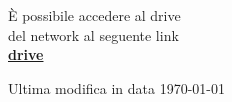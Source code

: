 \documentclass[a4paper, 11pt, oneside, article]{book} %
\begin{document}
\begin{titlepage}
	
	\vspace*{3\baselineskip} %
	
	È possibile accedere al drive \\del network al seguente link\\
	\textbf{\href{https://drive.google.com/drive/folders/0BwzuyD3iLGcbcUNxTVNOVE9FR1E}{drive}}
	
	\vspace{0.5\baselineskip} %
	
	\vspace{3\baselineskip} %
	
	
	\vfill %
	
	
	{\large Ultima modifica in data \today} 

\end{titlepage}
\end{document}
